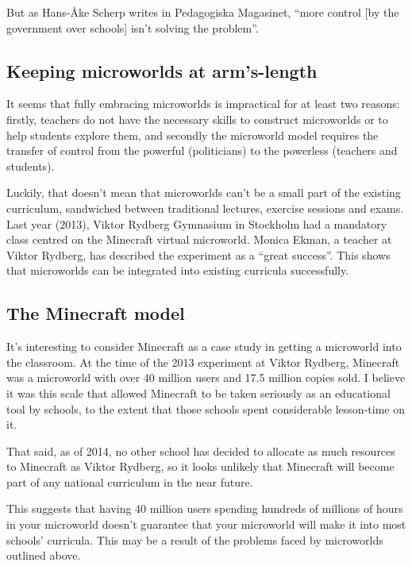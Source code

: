 But as Hans-Åke Scherp writes in Pedagogiska Magasinet, 
``more control [by the government over schools] isn't solving the
problem''\cite{pedmag}.

\subsection{Keeping microworlds at arm's-length}

It seems that fully embracing microworlds is impractical for at least
two reasons: firstly, teachers do not have the necessary skills to
construct microworlds or to help students explore them, and secondly the
microworld model requires the transfer of control from the powerful
(politicians) to the powerless (teachers and students).

Luckily, that doesn't mean that microworlds can't be a small part of the
existing curriculum, sandwiched between traditional lectures, exercise
sessions and exams. Last year (2013), Viktor Rydberg Gymnasium in
Stockholm had a mandatory class centred on the Minecraft virtual
microworld. Monica Ekman, a teacher at Viktor Rydberg, has described the
experiment as a ``great success''\cite{local:minecraft}. This shows that microworlds
can be integrated into existing curricula successfully.

\subsection{The Minecraft model}

It's interesting to consider Minecraft as a case study in getting a
microworld into the classroom. At the time of the 2013 experiment at
Viktor Rydberg, Minecraft was a microworld with over 40 million users
and 17.5 million copies sold. I believe it was this scale that allowed
Minecraft to be taken seriously as an educational tool by schools, to
the extent that those schools spent considerable lesson-time on it.

That said, as of 2014, no other school has decided to allocate as much
resources to Minecraft as Viktor Rydberg, so it looks unlikely that
Minecraft will become part of any national curriculum in the near
future.

This suggests that having 40 million users spending hundreds of millions of hours
in your microworld doesn't guarantee that your microworld will make it
into most schools' curricula. This may be a result of the problems faced by 
microworlds outlined above.
